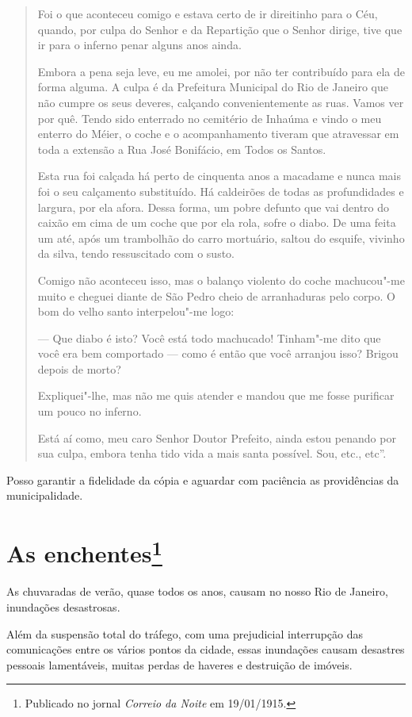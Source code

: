 \begin{quote}
Foi o que aconteceu comigo e estava certo de ir direitinho para o Céu,
quando, por culpa do Senhor e da Repartição que o Senhor dirige, tive
que ir para o inferno penar alguns anos ainda.

Embora a pena seja leve, eu me amolei, por não ter contribuído para ela
de forma alguma. A culpa é da Prefeitura Municipal do Rio de Janeiro que
não cumpre os seus deveres, calçando convenientemente as ruas. Vamos ver
por quê. Tendo sido enterrado no cemitério de Inhaúma e vindo o meu
enterro do Méier, o coche e o acompanhamento tiveram que atravessar em
toda a extensão a Rua José Bonifácio, em Todos os Santos.

Esta rua foi calçada há perto de cinquenta anos a macadame e nunca mais
foi o seu calçamento substituído. Há caldeirões de todas as
profundidades e largura, por ela afora. Dessa forma, um pobre defunto
que vai dentro do caixão em cima de um coche que por ela rola, sofre o
diabo. De uma feita um até, após um trambolhão do carro mortuário,
saltou do esquife, vivinho da silva, tendo ressuscitado com o susto.

Comigo não aconteceu isso, mas o balanço violento do coche machucou"-me
muito e cheguei diante de São Pedro cheio de arranhaduras pelo corpo. O
bom do velho santo interpelou"-me logo:

--- Que diabo é isto? Você está todo machucado! Tinham"-me dito que você
era bem comportado --- como é então que você arranjou isso? Brigou depois
de morto?

Expliquei"-lhe, mas não me quis atender e mandou que me fosse purificar
um pouco no inferno.

Está aí como, meu caro Senhor Doutor Prefeito, ainda estou penando por
sua culpa, embora tenha tido vida a mais santa possível. Sou, etc.,
etc''.
\end{quote}

Posso garantir a fidelidade da cópia e aguardar com paciência as
providências da municipalidade.



\chapter[As enchentes]{As enchentes\footnote[*]{Publicado no jornal \emph{Correio da Noite} em 19/01/1915.}}

As chuvaradas de verão, quase todos os anos, causam no nosso Rio de
Janeiro, inundações desastrosas.

Além da suspensão total do tráfego, com uma prejudicial interrupção das
comunicações entre os vários pontos da cidade, essas inundações causam
desastres pessoais lamentáveis, muitas perdas de haveres e destruição de
imóveis.

